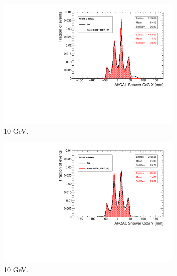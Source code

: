 \begin{figure}[htbp!]
  \centering
  \begin{subfigure}[t]{0.49\textwidth}
    \includegraphics[width=1.\linewidth]{../Thesis_Plots/Timing/Electrons/Plots/Run24542_CoGX_AHCAL_10GeV_Comparison.pdf}
    \caption{10 GeV.} \label{fig:e10GeVX}
  \end{subfigure}
  \hfill
  \begin{subfigure}[t]{0.49\textwidth}
    \includegraphics[width=1.\linewidth]{../Thesis_Plots/Timing/Electrons/Plots/Run24542_CoGY_AHCAL_10GeV_Comparison.pdf}
    \caption{10 GeV.} \label{fig:e10GeVY}
  \end{subfigure}
  \hfill
  \begin{subfigure}[t]{0.49\textwidth}

\end{subfigure}
\end{figure}
